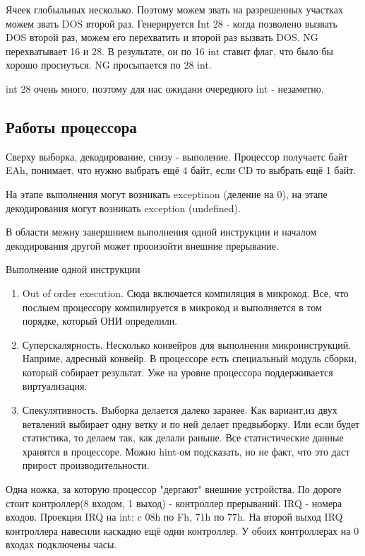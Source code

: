 Ячеек глобыльных несколько. Поэтому можем звать на разрешенных участках можем звать DOS второй раз. Генерируется Int 28 - когда позволено вызвать DOS второй раз, можем его перехватить и второй раз вызвать DOS. NG перехватывает 16 и 28. В результате, он по 16 int ставит флаг, что было бы хорошо проснуться. NG просыпается по 28 int.  

int 28 очень много, поэтому для нас ожидани очередного int - незаметно. 


\subsection{Работы процессора}
Сверху выборка, декодирование, снизу - выполение. Процессор получаетс байт EAh, понимает, что нужно выбрать ещё 4 байт, если CD то выбрать ещё 1 байт. 

На этапе выполнения могут возникать exceptinon (деление на 0), на этапе декодирования могут возникать exception (undefined).

В области межну завершнием выполнения одной инструкции и началом декодирования другой может прооизойти внешние прерывание.

Выполнение одной инструкции
\begin{enumerate}
\item Out of order execution. Сюда включается компиляция в микрокод. Все, что послыем процессору компилируется в микрокод и выполняется в том порядке, который ОНИ определили. 
\item Суперскалярность. Несколько конвейров для выполнения микроинструкций. Наприме, адресный конвейр. В процессоре есть специальный модуль сборки, который собирает результат. Уже на уровне процессора поддерживается виртуализация. 
\item Спекулятивность. Выборка делается далеко заранее. Как вариант,из двух ветвлений выбирает одну ветку и по ней делает предвыборку. Или если будет статистика, то делаем так, как делали раньше. Все статистические данные хранятся в процессоре. Можно hint-ом подсказать, но не факт, что это даст прирост производительности. 
\end{enumerate} 

Одна ножка, за которую процессор "дергают" внешние устройства.  По дороге стоит контроллер(8 входом, 1 выход) - контроллер прерываний. IRQ - номера входов. Проекция IRQ на int: c 08h по Fh,
71h по 77h. На второй выход IRQ контроллера навесили каскадно ещё одни контроллер. У обоих контроллерах на 0 входах подключены часы. 

